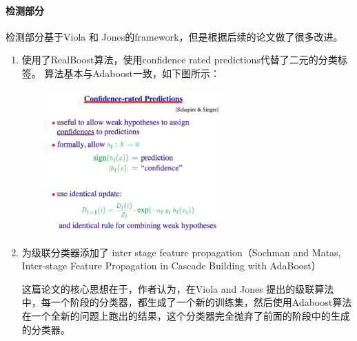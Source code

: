 \paragraph{检测部分}
检测部分基于Viola 和 Jones的framework，但是根据后续的论文做了很多改进。
\begin{enumerate}
\item
使用了RealBoost算法，使用confidence rated predictions代替了二元的分类标签。
算法基本与Adaboost一致，如下图所示：
\begin{figure}[H]
    \centering 
    \includegraphics[width=0.618\textwidth]{image/2_1_4_2.jpg}    
    \label{logic}
\end{figure}
\item
为级联分类器添加了 inter stage feature propagation（Sochman and Matas, Inter-stage Feature Propagation in Cascade Building with AdaBoost）

这篇论文的核心思想在于，作者认为，在Viola and Jones 提出的级联算法中，每一个阶段的分类器，都生成了一个新的训练集，然后使用Adaboost算法在一个全新的问题上跑出的结果，这个分类器完全抛弃了前面的阶段中的生成的分类器。


\end{enumerate}
